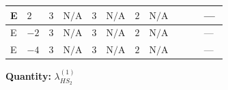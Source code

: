\documentclass[8pt]{article}
\begin{document}
\begin{landscape}
\begin{longtable}{@{}llcccccc >{\raggedright\arraybackslash}p{0.21\linewidth} >{\raggedright\arraybackslash}p{0.21\linewidth} >{\raggedright\arraybackslash}p{0.21\linewidth}@{}}
\midrule
E & $2$ & $3$ & $\text{N/A}$ & $3$ & $\text{N/A}$ & $2$ & $\text{N/A}$ & \scriptsize\adjustbox{max width=\linewidth}{$\begin{gathered} {\lambda_{HS_2}^{(1)}} (6 \operatorname{Tr}\!\left({Y_d}\,\left({Y_d}\right)^{\dagger}\right)+2 \operatorname{Tr}\!\left({Y_e}\,\left({Y_e}\right)^{\dagger}\right)+6 \operatorname{Tr}\!\left({Y_u}\,\left({Y_u}\right)^{\dagger}\right)+4 {\lambda_{S_2}^{(A)}})\end{gathered}$} & \scriptsize\adjustbox{max width=\linewidth}{$\begin{gathered} +4 {\lambda_5} \left({\lambda_5}\right)^{*}\end{gathered}$} & --- \\
\midrule
E & $-2$ & $3$ & $\text{N/A}$ & $3$ & $\text{N/A}$ & $2$ & $\text{N/A}$ & \scriptsize\adjustbox{max width=\linewidth}{$\begin{gathered} {\lambda_{HS_2}^{(1)}} (6 \operatorname{Tr}\!\left({Y_d}\,\left({Y_d}\right)^{\dagger}\right)+2 \operatorname{Tr}\!\left({Y_e}\,\left({Y_e}\right)^{\dagger}\right)+6 \operatorname{Tr}\!\left({Y_u}\,\left({Y_u}\right)^{\dagger}\right)+4 {\lambda_{S_2}^{(A)}})\end{gathered}$} & \scriptsize\adjustbox{max width=\linewidth}{$\begin{gathered} +4 {\lambda_5} \left({\lambda_5}\right)^{*}\end{gathered}$} & --- \\
\midrule
E & $-4$ & $3$ & $\text{N/A}$ & $3$ & $\text{N/A}$ & $2$ & $\text{N/A}$ & \scriptsize\adjustbox{max width=\linewidth}{$\begin{gathered} {\lambda_{HS_2}^{(1)}} (6 \operatorname{Tr}\!\left({Y_d}\,\left({Y_d}\right)^{\dagger}\right)+2 \operatorname{Tr}\!\left({Y_e}\,\left({Y_e}\right)^{\dagger}\right)+6 \operatorname{Tr}\!\left({Y_u}\,\left({Y_u}\right)^{\dagger}\right)+4 {\lambda_{S_2}^{(A)}})\end{gathered}$} & \scriptsize\adjustbox{max width=\linewidth}{$\begin{gathered} +4 {\lambda_5} \left({\lambda_5}\right)^{*}\end{gathered}$} & --- \\
\midrule
\bottomrule
\end{longtable}
\clearpage
\noindent\textbf{Quantity: }$\lambda_{HS_2}^{(1)}$\par\smallskip

\end{landscape}
\end{document}
